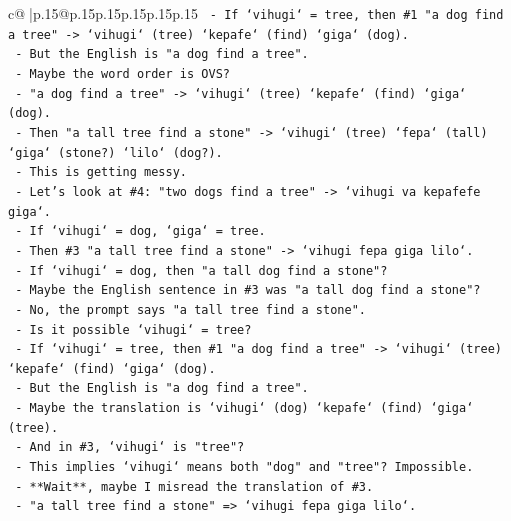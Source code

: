 \documentclass{article}
\begin{document}
{\begin{supertabular}{c@{$\;$}|p{.15\linewidth}@{}p{.15\linewidth}p{.15\linewidth}p{.15\linewidth}p{.15\linewidth}p{.15\linewidth}}
{{{\texttt{                    {-}   If `vihugi` = tree, then \#1 "a dog find a tree" {-}> `vihugi` (tree) `kepafe` (find) `giga` (dog).} \\
\texttt{                    {-}   But the English is "a dog find a tree".} \\
\texttt{                    {-}   Maybe the word order is OVS?} \\
\texttt{                    {-}   "a dog find a tree" {-}> `vihugi` (tree) `kepafe` (find) `giga` (dog).} \\
\texttt{                    {-}   Then "a tall tree find a stone" {-}> `vihugi` (tree) `fepa` (tall) `giga` (stone?) `lilo` (dog?).} \\
\texttt{                    {-}   This is getting messy.} \\
\texttt{                {-}   Let's look at \#4: "two dogs find a tree" {-}> `vihugi va kepafefe giga`.} \\
\texttt{                    {-}   If `vihugi` = dog, `giga` = tree.} \\
\texttt{                    {-}   Then \#3 "a tall tree find a stone" {-}> `vihugi fepa giga lilo`.} \\
\texttt{                    {-}   If `vihugi` = dog, then "a tall dog find a stone"?} \\
\texttt{                    {-}   Maybe the English sentence in \#3 was "a tall dog find a stone"?} \\
\texttt{                    {-}   No, the prompt says "a tall tree find a stone".} \\
\texttt{                    {-}   Is it possible `vihugi` = tree?} \\
\texttt{                    {-}   If `vihugi` = tree, then \#1 "a dog find a tree" {-}> `vihugi` (tree) `kepafe` (find) `giga` (dog).} \\
\texttt{                    {-}   But the English is "a dog find a tree".} \\
\texttt{                    {-}   Maybe the translation is `vihugi` (dog) `kepafe` (find) `giga` (tree).} \\
\texttt{                    {-}   And in \#3, `vihugi` is "tree"?} \\
\texttt{                    {-}   This implies `vihugi` means both "dog" and "tree"? Impossible.} \\
\texttt{                {-}   **Wait**, maybe I misread the translation of \#3.} \\
\texttt{                {-}   "a tall tree find a stone" => `vihugi fepa giga lilo`.} \\
}}}
\end{supertabular}}
\end{document}
